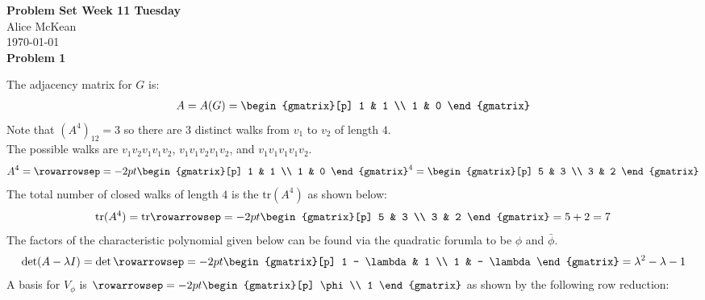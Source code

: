 \documentclass[fleqn]{article}
\newcommand{\problem}[1]{\large\textbf{Problem #1}\normalsize}
\begin{document}
\noindent\Large\textbf{Problem Set Week 11 Tuesday} \\
\normalsize
Alice McKean \\
\today \\

\problem{1}

The adjacency matrix for $G$ is:
\begin{align*}
  A = A(G) =
  \begin{gmatrix}[p]
    1 & 1 \\
    1 & 0
  \end{gmatrix}
\end{align*}
Note that $\displaystyle {(A^4)}_{12} = 3$ so there are $3$ distinct walks from $v_1$ to $v_2$
of length $4$. \\
The possible walks are $v_1v_2v_1v_1v_2$, $v_1v_1v_2v_1v_2$, and $v_1v_1v_1v_1v_2$.
\begin{align*}
  A^4 =
  {\rowarrowsep=-2pt
   \begin{gmatrix}[p]
    1 & 1 \\
    1 & 0
   \end{gmatrix}
  }^4
  =
  \begin{gmatrix}[p]
    5 & 3 \\
    3 & 2
  \end{gmatrix}
\end{align*}
The total number of closed walks of length $4$ is the $\text{tr}(A^4)$ as shown
below:
\begin{align*}
  \text{tr}(A^4) = \text{tr}
  \rowarrowsep=-2pt
  \begin{gmatrix}[p]
    5 & 3 \\
    3 & 2
  \end{gmatrix}
  = 5 + 2 = 7
\end{align*}
The factors of the characteristic polynomial given below can be found via the
quadratic forumla to be $\phi$ and $\bar{\phi}$.
\begin{align*}
  \det(A - \lambda I) =
  \det
  \rowarrowsep=-2pt
  \begin{gmatrix}[p]
    1 - \lambda & 1 \\
    1 & - \lambda
  \end{gmatrix}
  = \lambda^2 - \lambda - 1
\end{align*}
A basis for $V_{\phi}$ is
$
\rowarrowsep=-2pt
\begin{gmatrix}[p]
  \phi \\
  1
\end{gmatrix}
$
as shown by the following row reduction:
\end{document}
